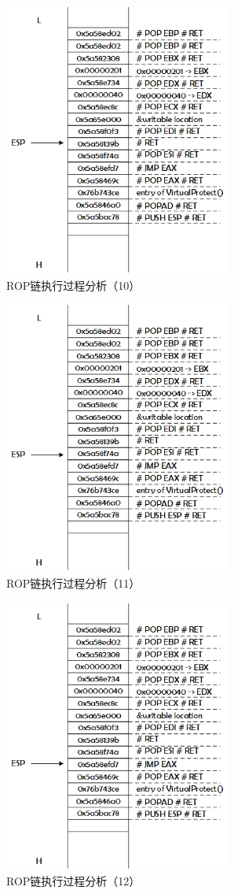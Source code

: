 \documentclass[bachelor]{thesis-uestc}
\begin{document}
\begin{figure}[htbp]
	\centering\includegraphics[height=9cm]{images/rop_chain_s10.png}
	\caption{ROP链执行过程分析（10）}
	\label{fig:rop_chain_s10}
\end{figure}

\begin{figure}[htbp]
	\centering\includegraphics[height=9cm]{images/rop_chain_s11.png}
	\caption{ROP链执行过程分析（11）}
	\label{fig:rop_chain_s11}
\end{figure}

\begin{figure}[htbp]
	\centering\includegraphics[height=9cm]{images/rop_chain_s12.png}
	\caption{ROP链执行过程分析（12）}
	\label{fig:rop_chain_s12}
\end{figure}
\end{document}
